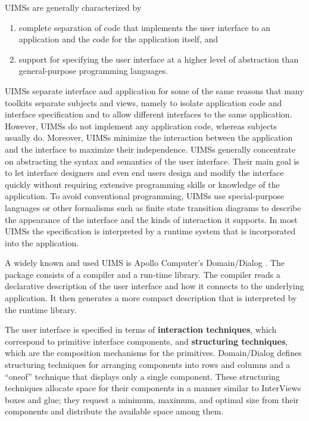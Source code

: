 UIMSs are generally characterized by

\begin{enumerate}

\item complete separation of code that implements the user
interface to an application and the code for the application itself, and

\item support for specifying the user interface at a higher level of
abstraction than general-purpose programming languages.

\end{enumerate}

UIMSs separate interface and application for some of the same reasons
that many toolkits separate subjects and views, namely to isolate
application code and interface specification and to allow different
interfaces to the same application.  However, UIMSs do not implement
any application code, whereas subjects usually do.  Moreover, UIMSs
minimize the interaction between the application and the interface to
maximize their independence.  UIMSs generally concentrate on
abstracting the syntax and semantics of the user interface.  Their
main goal is to let interface designers and even end users design and
modify the interface quickly without requiring extensive programming
skills or knowledge of the application.  To avoid conventional
programming, UIMSs use special-purpose languages or other
formalisms such as finite state transition diagrams to describe the
appearance of the interface and the kinds of interaction it supports.
In most UIMSs the specification is interpreted by a runtime system
that is incorporated into the application.

A widely known and used UIMS is Apollo Computer's
Domain/Dialog \cite{domainDialog}.  The package consists of a compiler
and a run-time library.  The compiler reads a declarative description of
the user interface and how it connects to the underlying application.
It then generates a more compact description that is
interpreted by the runtime library.

The user interface is specified in terms of {\bf interaction
techniques}, which correspond to primitive interface components, and
{\bf structuring techniques}, which are the composition mechanisms for
the primitives.  Domain/Dialog defines structuring techniques for
arranging components into rows and columns and a ``oneof'' technique
that displays only a single component.  These structuring techniques
allocate space for their components in a manner similar to InterViews
boxes and glue; they request a minimum, maximum, and optimal size from
their components and distribute the available space among them.

